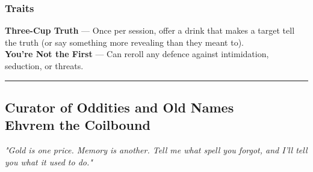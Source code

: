 \begin{paracol}{3}
    \subsubsection{Traits}
        \textbf{Three-Cup Truth} — Once per session, offer a drink that makes a target tell the truth (or say something more revealing than they meant to).\\
        \textbf{You’re Not the First} — Can reroll any defence against intimidation, seduction, or threats.
\end{paracol}

\vspace{.5\baselineskip}
\hrule
\vspace{.5\baselineskip}

\subsection{{\small Curator of Oddities and Old Names}\\ Ehvrem the Coilbound}
\label{npc:ehvrem-coilbound}

\emph{"Gold is one price. Memory is another. Tell me what spell you forgot, and I’ll tell you what it used to do."}
\vspace{.5\baselineskip}

